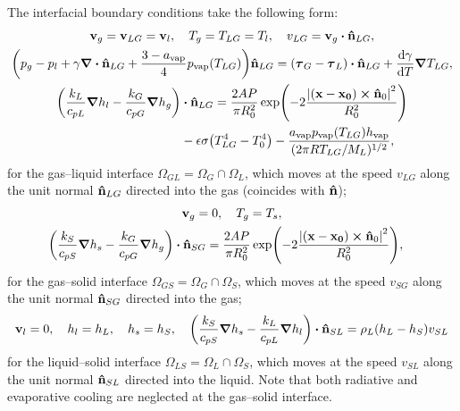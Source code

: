 \documentclass{article}
\newcommand{\evapor}[1]{{#1}_\mathrm{vap}}
\newcommand{\bv}{\vb{v}}
\newcommand{\bn}{\vu{n}}
\newcommand{\btau}{\vb*\tau}
\begin{document}
The interfacial boundary conditions take the following form:
\begin{gather}
    \bv_g = \bv_{LG} = \bv_l, \quad T_g = T_{LG} = T_l, \quad v_{LG} = \bv_g\vdot\bn_{LG}, \\
    \qty(p_g - p_l + \gamma\div\bn_{LG} + \frac{3-\evapor{a}}4\evapor{p}(T_{LG}))\bn_{LG}
    = (\btau_G - \btau_L)\vdot\bn_{LG} + \dv{\gamma}{T}\grad{T_{LG}}, \\
    \begin{aligned}
    \qty( \frac{k_L}{c_{pL}}\grad{h}_l - \frac{k_G}{c_{pG}}\grad{h}_g )&\vdot\bn_{LG}
        = \frac{2AP}{\pi R_0^2}\exp(-2\frac{\abs{(\vb{x}-\vb{x_0})\cp\bn_0}^2}{R_0^2}) \\
        &- \epsilon\sigma\qty(T_{LG}^4-T_0^4)
        - \frac{\evapor{a}\evapor{p}(T_{LG})\evapor{h}}{(2\pi RT_{LG}/M_L)^{1/2}},
    \end{aligned}
\end{gather}
for the gas--liquid interface $\Omega_{GL} = \Omega_G\cap\Omega_L$,
which moves at the speed $v_{LG}$ along the unit normal $\bn_{LG}$ directed into the gas (coincides with $\bn$);
\begin{gather}
    \bv_g = 0, \quad T_g = T_s, \\
    \begin{aligned}
    \qty( \frac{k_S}{c_{pS}}\grad{h}_s - \frac{k_G}{c_{pG}}\grad{h}_g )&\vdot\bn_{SG}
        = \frac{2AP}{\pi R_0^2}\exp(-2\frac{\abs{(\vb{x}-\vb{x_0})\cp\bn_0}^2}{R_0^2}),
    \end{aligned}
\end{gather}
for the gas--solid interface $\Omega_{GS} = \Omega_G\cap\Omega_S$,
which moves at the speed $v_{SG}$ along the unit normal $\bn_{SG}$ directed into the gas; \begin{equation}
    \bv_l = 0, \quad h_l = h_L, \quad h_s = h_S, \quad
    \qty( \frac{k_S}{c_{pS}}\grad{h}_s - \frac{k_L}{c_{pL}}\grad{h}_l )\vdot\bn_{SL}
        = \rho_L(h_L - h_S)v_{SL}
\end{equation}
for the liquid--solid interface $\Omega_{LS} = \Omega_L\cap\Omega_S$,
which moves at the speed $v_{SL}$ along the unit normal $\bn_{SL}$ directed into the liquid. 
Note that both radiative and evaporative cooling are neglected at the gas--solid interface.

\printbibliography
\end{document}
